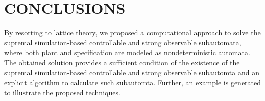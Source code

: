 \documentclass[12pt,draftcls,onecolumn]{IEEEtran}
\begin{document}
\section{CONCLUSIONS}

By resorting to lattice theory, we proposed a computational approach
to solve the supremal simulation-based controllable and strong
observable subautomata, where both plant and specification are
modeled as nondeterministic automata. The obtained solution provides
a sufficient condition of the existence of the supremal
simulation-based controllable and strong observable subautomta and
an explicit algorithm to calculate such subautomta. Further, an
example is generated to illustrate the proposed techniques.
\end{document}
